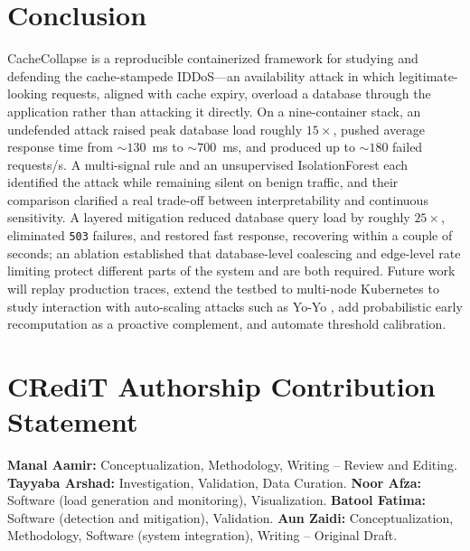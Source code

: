 \documentclass[conference]{IEEEtran}
\begin{document}
\section{Conclusion}
CacheCollapse is a reproducible containerized framework for studying and defending the
cache-stampede IDDoS---an availability attack in which legitimate-looking requests,
aligned with cache expiry, overload a database through the application rather than
attacking it directly. On a nine-container stack, an undefended attack raised peak
database load roughly $15\times$, pushed average response time from ${\sim}130$~ms to
${\sim}700$~ms, and produced up to ${\sim}180$ failed requests/s. A multi-signal rule
and an unsupervised IsolationForest each identified the attack while remaining silent
on benign traffic, and their comparison clarified a real trade-off between
interpretability and continuous sensitivity. A layered mitigation reduced database
query load by roughly $25\times$, eliminated \texttt{503} failures, and restored fast
response, recovering within a couple of seconds; an ablation established that
database-level coalescing and edge-level rate limiting protect different parts of the
system and are both required. Future work will replay production traces, extend the
testbed to multi-node Kubernetes to study interaction with auto-scaling attacks such
as Yo-Yo \cite{sides2016}, add probabilistic early recomputation \cite{vattani2015} as
a proactive complement, and automate threshold calibration.

\section*{CRediT Authorship Contribution Statement}
\textbf{Manal Aamir:} Conceptualization, Methodology, Writing -- Review and Editing.
\textbf{Tayyaba Arshad:} Investigation, Validation, Data Curation.
\textbf{Noor Afza:} Software (load generation and monitoring), Visualization.
\textbf{Batool Fatima:} Software (detection and mitigation), Validation.
\textbf{Aun Zaidi:} Conceptualization, Methodology, Software (system integration),
Writing -- Original Draft.



\end{document}
